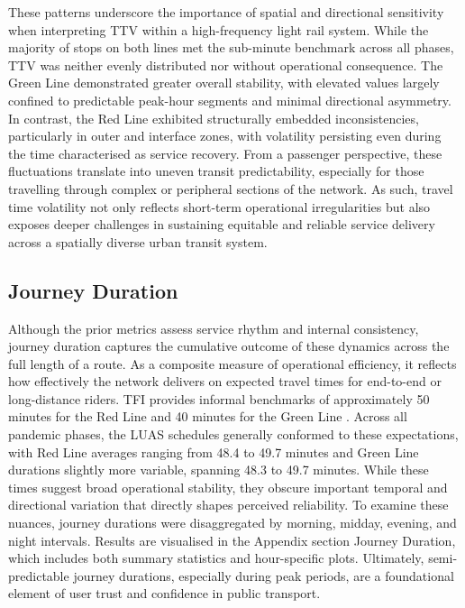     These patterns underscore the importance of spatial and directional sensitivity when interpreting TTV within a high-frequency light rail system. While the majority of stops on both lines met the sub-minute benchmark across all phases, TTV was neither evenly distributed nor without operational consequence. The Green Line demonstrated greater overall stability, with elevated values largely confined to predictable peak-hour segments and minimal directional asymmetry. In contrast, the Red Line exhibited structurally embedded inconsistencies, particularly in outer and interface zones, with volatility persisting even during the time characterised as service recovery. From a passenger perspective, these fluctuations translate into uneven transit predictability, especially for those travelling through complex or peripheral sections of the network. As such, travel time volatility not only reflects short-term operational irregularities but also exposes deeper challenges in sustaining equitable and reliable service delivery across a spatially diverse urban transit system.

\subsection*{Journey Duration}

    Although the prior metrics assess service rhythm and internal consistency, journey duration captures the cumulative outcome of these dynamics across the full length of a route. As a composite measure of operational efficiency, it reflects how effectively the network delivers on expected travel times for end-to-end or long-distance riders. TFI provides informal benchmarks of approximately 50 minutes for the Red Line and 40 minutes for the Green Line \parencite{tii_operations}. Across all pandemic phases, the LUAS schedules generally conformed to these expectations, with Red Line averages ranging from 48.4 to 49.7 minutes and Green Line durations slightly more variable, spanning 48.3 to 49.7 minutes. While these times suggest broad operational stability, they obscure important temporal and directional variation that directly shapes perceived reliability. To examine these nuances, journey durations were disaggregated by morning, midday, evening, and night intervals. Results are visualised in the Appendix section Journey Duration, which includes both summary statistics and hour-specific plots. Ultimately, semi-predictable journey durations, especially during peak periods, are a foundational element of user trust and confidence in public transport.

